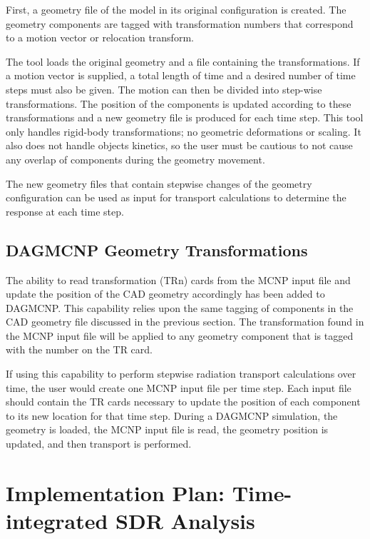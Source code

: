 First, a geometry file of the model in its 
original configuration is created. The geometry components are tagged with 
transformation numbers that correspond to a motion vector or relocation transform.

The tool loads the original geometry and a file containing the transformations.
If a motion vector is supplied, a total length of time and a desired number of 
time steps must also be given. The motion can then be divided into step-wise 
transformations. The position of the components 
is updated according to these transformations and a new geometry file is 
produced for each time step.  This tool only handles rigid-body
transformations; no geometric deformations or scaling.  It also does not handle
objects kinetics, 
so the user must be cautious to not cause any overlap of components during the
geometry movement.

The new geometry files that contain stepwise changes of the geometry 
configuration can be used as input for
transport calculations to determine the response at each time step.


\subsection{DAGMCNP Geometry Transformations}\label{sec:mcnp_tr}
The ability to read transformation (TRn) cards from the MCNP input file and 
update the position of the CAD geometry accordingly has been added to DAGMCNP.  
This capability relies upon the same tagging of components in the CAD geometry 
file discussed in the previous section.  The transformation found in the MCNP 
input file will be applied to any geometry component that is tagged with the 
number on the TR card. 

If using this capability to perform stepwise radiation transport calculations
over time, the user would create one MCNP input file per time step.  Each input file 
should contain the TR cards necessary to update the position of each component 
to its new location for that time step.  During a DAGMCNP simulation, the 
geometry is loaded, the MCNP input file is read, the geometry position is 
updated, and then transport is performed.

\section{Implementation Plan: Time-integrated SDR Analysis}\label{sec:implementation}

